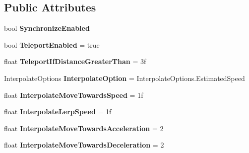 \subsection*{Public Attributes}
\begin{DoxyCompactItemize}
\item 
bool {\bfseries Synchronize\+Enabled}\hypertarget{class_photon_transform_view_position_model_adf69a879201b7b67af4508ccf795f6ac}{}\label{class_photon_transform_view_position_model_adf69a879201b7b67af4508ccf795f6ac}

\item 
bool {\bfseries Teleport\+Enabled} = true\hypertarget{class_photon_transform_view_position_model_a8e36aa06dc6644a53bd2d87844434e84}{}\label{class_photon_transform_view_position_model_a8e36aa06dc6644a53bd2d87844434e84}

\item 
float {\bfseries Teleport\+If\+Distance\+Greater\+Than} = 3f\hypertarget{class_photon_transform_view_position_model_a98c785fa35877aae22620b6533a15cd8}{}\label{class_photon_transform_view_position_model_a98c785fa35877aae22620b6533a15cd8}

\item 
Interpolate\+Options {\bfseries Interpolate\+Option} = Interpolate\+Options.\+Estimated\+Speed\hypertarget{class_photon_transform_view_position_model_a333c00379e52fd0327337edb6d918d5f}{}\label{class_photon_transform_view_position_model_a333c00379e52fd0327337edb6d918d5f}

\item 
float {\bfseries Interpolate\+Move\+Towards\+Speed} = 1f\hypertarget{class_photon_transform_view_position_model_aa0c899efb93f49d72d09f186cf0a61e0}{}\label{class_photon_transform_view_position_model_aa0c899efb93f49d72d09f186cf0a61e0}

\item 
float {\bfseries Interpolate\+Lerp\+Speed} = 1f\hypertarget{class_photon_transform_view_position_model_a6a74d5fd4dca600a17784f38b70d2aa7}{}\label{class_photon_transform_view_position_model_a6a74d5fd4dca600a17784f38b70d2aa7}

\item 
float {\bfseries Interpolate\+Move\+Towards\+Acceleration} = 2\hypertarget{class_photon_transform_view_position_model_a51965afc54a2e2cbaafb57e050555688}{}\label{class_photon_transform_view_position_model_a51965afc54a2e2cbaafb57e050555688}

\item 
float {\bfseries Interpolate\+Move\+Towards\+Deceleration} = 2\hypertarget{class_photon_transform_view_position_model_a623f6bbf22e22073e9be25b84d98a11c}{}\label{class_photon_transform_view_position_model_a623f6bbf22e22073e9be25b84d98a11c}


\end{DoxyCompactItemize}
